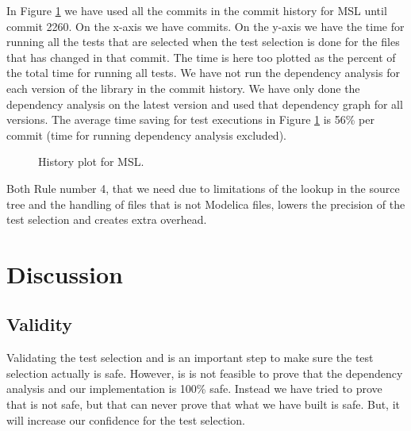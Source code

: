 \documentclass{cslthse-msc}
\begin{document}
In Figure \ref{fig:mslhistory} we have used all the commits in the commit history for MSL until commit 2260. On the x-axis we have commits. On the y-axis we have the time for running all the tests that are selected when the test selection is done for the files that has changed in that commit. The time is here too plotted as the percent of the total time for running all tests. We have not run the dependency analysis for each version of the library in the commit history. We have only done the dependency analysis on the latest version and used that dependency graph for all versions. The average time saving for test executions in Figure \ref{fig:mslhistory} is 56\% per commit (time for running dependency analysis excluded).

\begin{figure}[!htbp]
    \centering
    \caption{History plot for MSL.}
    \label{fig:mslhistory}
\end{figure}
 
 Both Rule number 4, that we need due to limitations of the lookup in the source tree and the handling of files that is not Modelica files, lowers the precision of the test selection and creates extra overhead.

\chapter[Discussion]{Discussion}

\section{Validity}
Validating the test selection and is an important step to make sure the test selection actually is safe. 
However, is is not feasible to prove that the dependency analysis and our implementation is 100\% safe. Instead we have tried to prove that is not safe, but that can never prove that what we have built is safe. But, it will increase our confidence for the test selection. 
\end{document}
